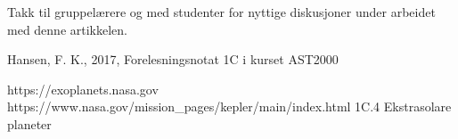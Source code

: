 \documentclass[12pt,preprint]{aastex6}
\begin{document}
\begin{acknowledgments}
Takk til gruppelærere og med studenter for nyttige diskusjoner under arbeidet med denne artikkelen. 
\end{acknowledgments}




\begin{thebibliography}{}
 Hansen, F. K.,  2017, Forelesningsnotat 1C i kurset AST2000

https://exoplanets.nasa.gov
https://www.nasa.gov/mission\_pages/kepler/main/index.html
1C.4 Ekstrasolare planeter

\end{thebibliography}
\end{document}
